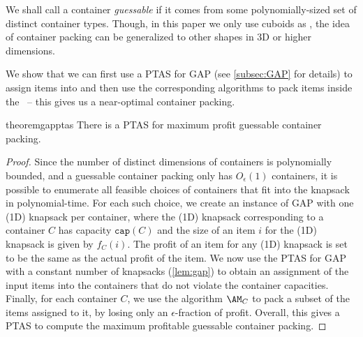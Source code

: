 We shall call a container \emph{guessable} if it comes from some polynomially-sized set of distinct container types. Though, in this paper we only use cuboids as \boxes, the idea of container packing can be generalized to other shapes in 3D or higher dimensions. 

We show that we can first use a PTAS for GAP (see \cref{subsec:GAP} for details) to assign items into \boxes and
then use the corresponding algorithms to pack items inside the \boxes\ -- this gives us a near-optimal container packing.


\begin{restatable}{theorem}{gapptas}
\label{thm:ptasboxpacking}
    There is a PTAS for maximum profit guessable container packing.
\end{restatable}
\begin{proof}
    Since the number of distinct dimensions of containers is polynomially bounded, and a guessable container packing only has $O_{\epsilon}(1)$ containers, it is possible to enumerate all feasible choices of containers that fit into the knapsack in polynomial-time. For each such choice, we create an instance of GAP with one (1D) knapsack per container, where the (1D) knapsack corresponding to a container $C$ has capacity $\mathtt{cap}(C)$ and the size of an item $i$ for the (1D) knapsack is given by $f_C(i)$. The profit of an item for any (1D) knapsack is set to be the same as the actual profit of the item. We now use the PTAS for GAP with a constant number of knapsacks
    (\cref{lem:gap})
    to obtain an assignment of the input items into the containers that do not violate the container capacities. Finally, for each container $C$, we use the algorithm $\AM_C$ to pack a subset of the items assigned to it, by losing only an $\epsilon$-fraction of profit. Overall, this gives a PTAS to compute the maximum profitable guessable container packing. 
\end{proof}



